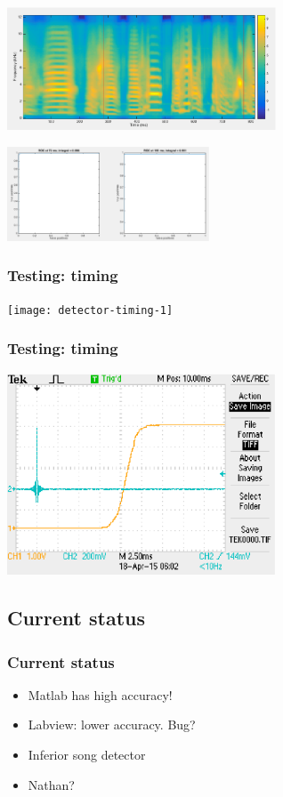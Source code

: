 \documentclass{beamer}
\begin{document}
\begin{frame}
  \begin{center}
    \includegraphics[width=8cm]{detector2-spectrogram}
  \end{center}
  \par
  \begin{center}
    \includegraphics[width=6cm]{detector2-roc}
  \end{center}
\end{frame}


\begin{frame}
  \frametitle{Testing: timing}
  \texttt{[image: detector-timing-1]}
\end{frame}

\begin{frame}
  \frametitle{Testing: timing}
  \includegraphics[width=8cm]{detector-timing-2}
\end{frame}

\subsection{Current status}

\begin{frame}
  \frametitle{Current status}
  \begin{itemize}
    \item Matlab has high accuracy!
    \item Labview: lower accuracy.  Bug?
    \item Inferior song detector
    \item Nathan?
  \end{itemize}
\end{frame}
\end{document}
